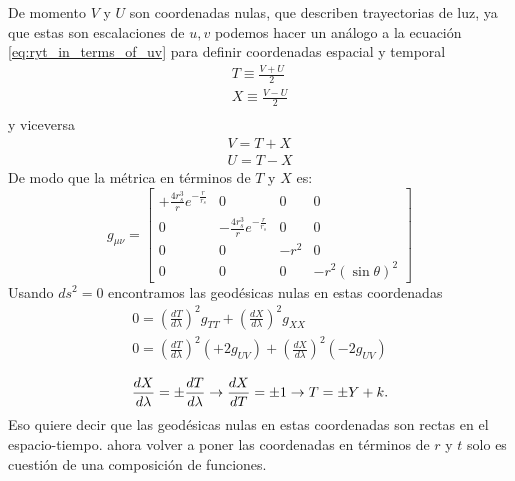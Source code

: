 De momento $V$ y $U$ son coordenadas nulas, que describen trayectorias de luz, ya que estas son escalaciones de $u,v$ podemos hacer un análogo a la ecuación \ref{eq:ryt_in_terms_of_uv} para definir coordenadas espacial y temporal
\begin{equation}
    \begin{aligned}
        T \equiv \frac{V+U}{2} \\
        X \equiv \frac{V-U}{2} \\
    \end{aligned}
\end{equation}
y viceversa
\begin{equation}
    \begin{aligned}
        V=T+X \\
        U=T-X
    \end{aligned}
\end{equation}
De modo que la métrica en términos de $T$ y $X$ es:
\begin{equation}
    g_{\mu \nu} =\left[\begin{array}{cccc}
            +\frac{4 r_s^3}{r} e^{-\frac{r}{r_s}} & 0                                     & 0    & 0                   \\
            0                                     & -\frac{4 r_s^3}{r} e^{-\frac{r}{r_s}} & 0    & 0                   \\
            0                                     & 0                                     & -r^2 & 0                   \\
            0                                     & 0                                     & 0    & -r^2(\sin \theta)^2
        \end{array}\right]
\end{equation}
Usando $ds^2 = 0 $ encontramos las geodésicas nulas en estas coordenadas
\begin{equation}
    \begin{array}{l}

        0=\left(\frac{d T}{d \lambda}\right)^2 g_{T T}+\left(\frac{d X}{d \lambda}\right)^2 g_{X X} \\
        0=\left(\frac{d T}{d \lambda}\right)^2\left(+2 g_{U V}\right)+\left(\frac{d X}{d \lambda}\right)^2\left(-2 g_{U V}\right)
    \end{array}
\end{equation}

\begin{equation}
    \frac{d X}{d \lambda} =\pm \frac{d T}{d \lambda} \to \frac{d X}{d T} = \pm 1 \to T = \pm Y + k.
\end{equation}
Eso quiere decir que las geodésicas nulas en estas coordenadas son rectas en el espacio-tiempo.
ahora volver a poner las coordenadas en términos de $r$ y $t$ solo es cuestión de una composición de funciones.

